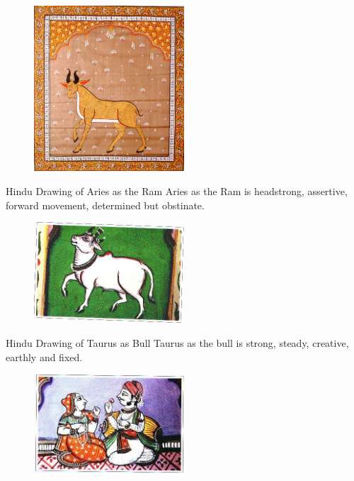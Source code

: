 \begin{figure}[H]
 \centering
\includegraphics[width=0.5\textwidth]{pics/Aries.png}
 \end{figure}
 

Hindu Drawing of Aries as the Ram
Aries as the Ram is headstrong, assertive, forward movement, determined but obstinate.


 \begin{figure}[H]
 \centering
\includegraphics[width=0.5\textwidth]{pics/Taurus.png}
 \end{figure}

Hindu Drawing of Taurus as Bull
Taurus as the bull is strong, steady, creative, earthly and fixed.



 \begin{figure}[H]
 \centering
\includegraphics[width=0.5\textwidth]{pics/Gemini.png}
 \end{figure}

